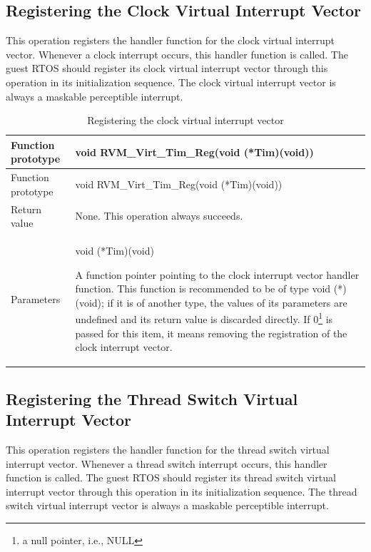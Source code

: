 \subsection{Registering the Clock Virtual Interrupt Vector}\label{subsec:4-5-6}

This operation registers the handler function for the clock virtual interrupt vector. Whenever a clock interrupt occurs, this handler function is called. The guest RTOS should register its clock virtual interrupt vector through this operation in its initialization sequence. The clock virtual interrupt vector is always a maskable perceptible interrupt.

\begin{xltabular}{\textwidth}{@{}>{\hsize\raggedright\arraybackslash}X>{\hsize\raggedright\arraybackslash}X@{}}
\caption{Registering the clock virtual interrupt vector}\label{tab:4-24}\\
\toprule
Function prototype & void RVM\_\allowbreak{}Virt\_\allowbreak{}Tim\_\allowbreak{}Reg(void (*Tim)(void))\tabularnewline
\endfirsthead
\toprule
Function prototype & void RVM\_\allowbreak{}Virt\_\allowbreak{}Tim\_\allowbreak{}Reg(void (*Tim)(void))\tabularnewline
\midrule
\endhead
\bottomrule
\endlastfoot
Return value & None. This operation always succeeds.\tabularnewline
Parameters\strut
 & void (*Tim)(void)

A function pointer pointing to the clock interrupt vector handler function. This function is recommended to be of type void
(*)(void); if it is of another type, the values of its parameters are undefined and its return value is discarded directly. If 0\footnote{a null pointer, i.e., NULL} is passed for this item, it means removing the registration of the clock interrupt vector.\strut
\tabularnewline
\end{xltabular}

\subsection{Registering the Thread Switch Virtual Interrupt Vector}\label{subsec:4-5-7}

This operation registers the handler function for the thread switch virtual interrupt vector. Whenever a thread switch interrupt occurs, this handler function is called. The guest RTOS should register its thread switch virtual interrupt vector through this operation in its initialization sequence. The thread switch virtual interrupt vector is always a maskable perceptible interrupt.

